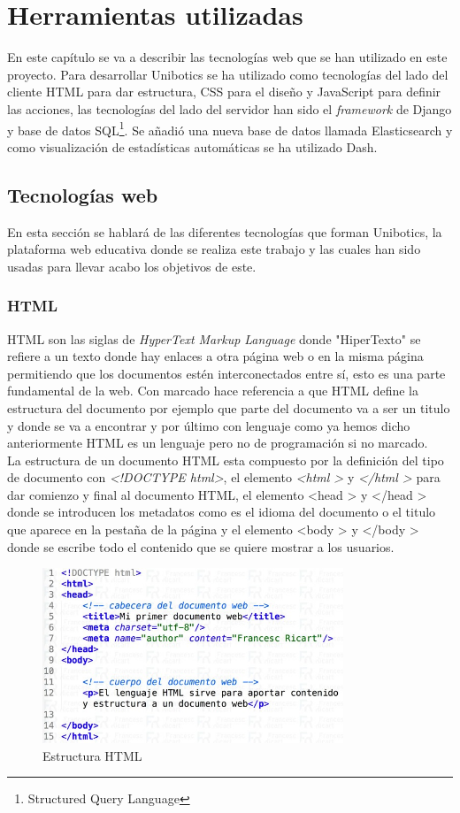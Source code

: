 \chapter{Herramientas utilizadas}
\label{herramientas}
En este capítulo se va a describir las tecnologías web que se han utilizado en este proyecto. Para desarrollar Unibotics se ha utilizado como tecnologías del lado del cliente HTML para dar estructura, CSS para el diseño y JavaScript para definir las acciones, las tecnologías del lado del servidor han sido el \textit{framework} de Django y base de datos SQL\footnote{Structured Query Language}. Se añadió una nueva base de datos llamada Elasticsearch y como visualización de estadísticas automáticas se ha utilizado Dash.
\section{Tecnologías web}
En esta sección se hablará de las diferentes tecnologías que forman Unibotics, la plataforma web educativa donde se realiza este trabajo y las cuales han sido usadas para llevar acabo los objetivos de este.
\subsection{HTML}
HTML son las siglas de \textit{HyperText Markup Language} donde "HiperTexto" se refiere a un texto donde hay enlaces a otra página web o en la misma página permitiendo que los documentos estén interconectados entre sí, esto es una parte fundamental de la web. Con marcado hace referencia a que HTML define la estructura del documento por ejemplo que parte del documento va a ser un titulo y donde se va a encontrar y por último con lenguaje como ya hemos dicho anteriormente HTML es un lenguaje pero no de programación si no marcado.\\

La estructura de un documento HTML esta compuesto por la definición del tipo de documento con \textit{\textless!DOCTYPE html\textgreater}, el elemento  \textit{\textless html \textgreater} y \textit{\textless/html \textgreater} para dar comienzo y final al documento HTML, el elemento {\textless head \textgreater} y {\textless/head \textgreater} donde se introducen los metadatos como es el idioma del documento o el titulo que aparece en la pestaña de la página y el elemento {\textless body \textgreater} y {\textless/body \textgreater} donde se escribe todo el contenido que se quiere mostrar a los usuarios.\cite{html}

\begin{figure}[H]
    \centering
    \includegraphics[width=9cm, keepaspectratio]{img/html.jpg}
    \caption{Estructura HTML}
    \label{fig:html}
\end{figure}

